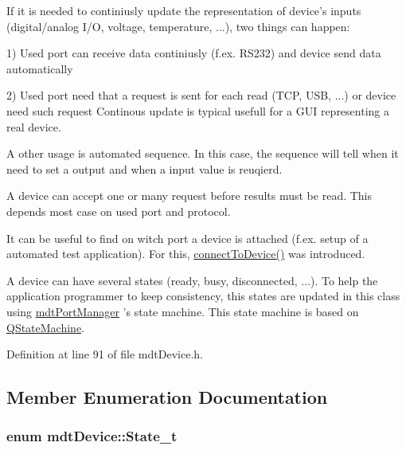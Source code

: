 If it is needed to continiusly update the representation of device's inputs (digital/analog I/\-O, voltage, temperature, ...), two things can happen\-:
\begin{DoxyItemize}
\item 1) Used port can receive data continiusly (f.\-ex. R\-S232) and device send data automatically
\item 2) Used port need that a request is sent for each read (T\-C\-P, U\-S\-B, ...) or device need such request Continous update is typical usefull for a G\-U\-I representing a real device.
\end{DoxyItemize}

A other usage is automated sequence. In this case, the sequence will tell when it need to set a output and when a input value is reuqierd.

A device can accept one or many request before results must be read. This depends most case on used port and protocol.

It can be useful to find on witch port a device is attached (f.\-ex. setup of a automated test application). For this, \hyperlink{classmdt_device_a0c265d9078bf50708aa60a73b5125667}{connect\-To\-Device()} was introduced.

A device can have several states (ready, busy, disconnected, ...). To help the application programmer to keep consistency, this states are updated in this class using \hyperlink{classmdt_port_manager}{mdt\-Port\-Manager} 's state machine. This state machine is based on \hyperlink{class_q_state_machine}{Q\-State\-Machine}. 

Definition at line 91 of file mdt\-Device.\-h.



\subsection{Member Enumeration Documentation}
\hypertarget{classmdt_device_a8bcf508fbd38a8f0b235e8a9b00319f6}{
\subsubsection[{State\-\_\-t}]{\setlength{\rightskip}{0pt plus 5cm}enum {\bf mdt\-Device\-::\-State\-\_\-t}\hspace{0.3cm}{\ttfamily [strong]}}}\label{classmdt_device_a8bcf508fbd38a8f0b235e8a9b00319f6}


